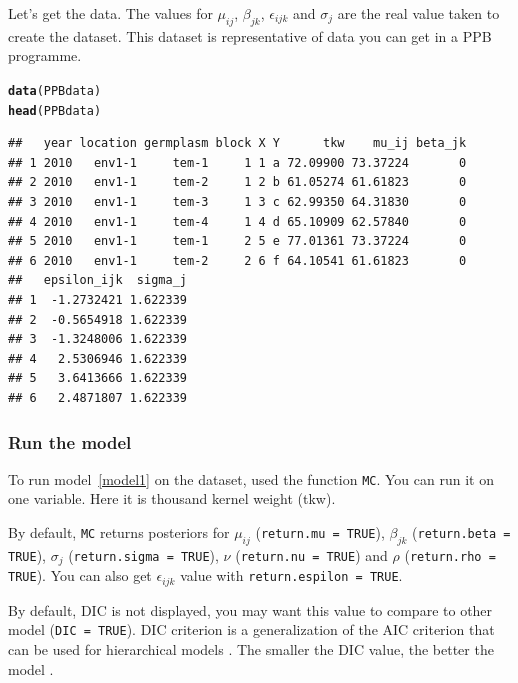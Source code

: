 \documentclass{article}\usepackage[]{graphicx}\usepackage[]{color}
\makeatletter
\newcommand{\hlstd}[1]{\textcolor[rgb]{0.345,0.345,0.345}{#1}}%
\newcommand{\hlkwd}[1]{\textcolor[rgb]{0.737,0.353,0.396}{\textbf{#1}}}%
\newenvironment{kframe}{%
 \def\at@end@of@kframe{}%
 \ifinner\ifhmode%
  \def\at@end@of@kframe{\end{minipage}}%
  \begin{minipage}{\columnwidth}%
 \fi\fi%
 \def\FrameCommand##1{\hskip\@totalleftmargin \hskip-\fboxsep
 \colorbox{shadecolor}{##1}\hskip-\fboxsep
     \hskip-\linewidth \hskip-\@totalleftmargin \hskip\columnwidth}%
 \MakeFramed {\advance\hsize-\width
   \@totalleftmargin\z@ \linewidth\hsize
   \@setminipage}}%
 {\par\unskip\endMakeFramed%
 \at@end@of@kframe}
\newenvironment{knitrout}{}{} %
\makeatother
\begin{document}
Let's get the data.
The values for $\mu_{ij}$, $\beta_{jk}$, $\epsilon_{ijk}$ and $\sigma_j$ are the real value taken to create the dataset.
This dataset is representative of data you can get in a PPB programme.

\begin{knitrout}
\color{fgcolor}\begin{kframe}
\begin{alltt}
\hlkwd{data}\hlstd{(PPBdata)}
\hlkwd{head}\hlstd{(PPBdata)}
\end{alltt}
\begin{verbatim}
##   year location germplasm block X Y      tkw    mu_ij beta_jk
## 1 2010   env1-1     tem-1     1 1 a 72.09900 73.37224       0
## 2 2010   env1-1     tem-2     1 2 b 61.05274 61.61823       0
## 3 2010   env1-1     tem-3     1 3 c 62.99350 64.31830       0
## 4 2010   env1-1     tem-4     1 4 d 65.10909 62.57840       0
## 5 2010   env1-1     tem-1     2 5 e 77.01361 73.37224       0
## 6 2010   env1-1     tem-2     2 6 f 64.10541 61.61823       0
##   epsilon_ijk  sigma_j
## 1  -1.2732421 1.622339
## 2  -0.5654918 1.622339
## 3  -1.3248006 1.622339
## 4   2.5306946 1.622339
## 5   3.6413666 1.622339
## 6   2.4871807 1.622339
\end{verbatim}
\end{kframe}
\end{knitrout}

\subsubsection{Run the model}

To run model~\ref{model1} on the dataset, used the function \texttt{MC}.
You can run it on one variable.
Here it is thousand kernel weight (tkw).

By default, \texttt{MC} returns posteriors for 
$\mu_{ij}$ (\texttt{return.mu = TRUE}), 
$\beta_{jk}$ (\texttt{return.beta = TRUE}), 
$\sigma_j$ (\texttt{return.sigma = TRUE}), 
$\nu$ (\texttt{return.nu = TRUE}) and 
$\rho$ (\texttt{return.rho = TRUE}).
You can also get $\epsilon_{ijk}$ value with \texttt{return.espilon = TRUE}.

By default, DIC is not displayed, you may want this value to compare to other model (\texttt{DIC = TRUE}).
DIC criterion is a generalization of the AIC criterion that can be used for hierarchical models \citep{spiegelhalter_bayesian_2002}.
The smaller the DIC value, the better the model \citep{plummer_penalized_2008}.
\end{document}
